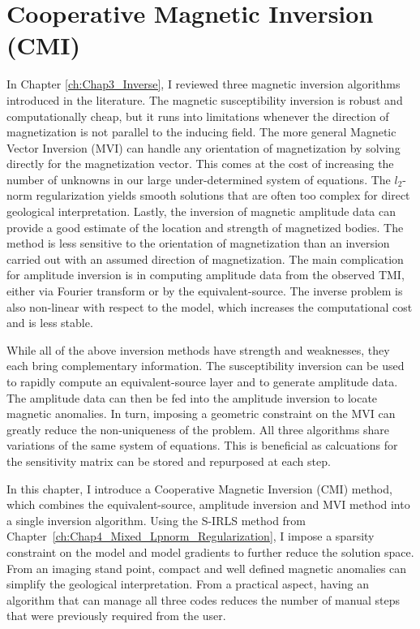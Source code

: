 \graphicspath{{./Figures/}}
\chapter{Cooperative Magnetic Inversion (CMI)}
\label{ch:Chap5_Cooperative_Mag_Inversion_CMI}

In Chapter \ref{ch:Chap3_Inverse}, I reviewed three magnetic inversion algorithms introduced in the literature. 
The magnetic susceptibility inversion is robust and computationally cheap, but it runs into limitations whenever the direction of magnetization is not parallel to the inducing field. 
The more general Magnetic Vector Inversion (MVI) can handle any orientation of magnetization by solving directly for the magnetization vector. 
This comes at the cost of increasing the number of unknowns in our large under-determined system of equations.
The $l_2$-norm regularization yields smooth solutions that are often too complex for direct geological interpretation.
Lastly, the inversion of magnetic amplitude data can provide a good estimate of the location and strength of magnetized bodies. 
The method is less sensitive to the orientation of magnetization than an inversion carried out with an assumed direction of magnetization.
The main complication for amplitude inversion is in computing amplitude data from the observed TMI, either via Fourier transform or by the equivalent-source. The inverse problem is also non-linear with respect to the model, which increases the computational cost and is less stable. 

While all of the above inversion methods have strength and weaknesses, they each bring complementary information.
The susceptibility inversion can be used to rapidly compute an equivalent-source layer and to generate amplitude data.
The amplitude data can then be fed into the amplitude inversion to locate magnetic anomalies.
In turn, imposing a geometric constraint on the MVI can greatly reduce the non-uniqueness of the problem. 
All three algorithms share variations of the same system of equations. This is beneficial as calcuations for the sensitivity matrix can be stored and repurposed at each step.

In this chapter, I introduce a Cooperative Magnetic Inversion (CMI) method, which combines the equivalent-source, amplitude inversion and MVI method into a single inversion algorithm. 
Using the S-IRLS method from Chapter~\ref{ch:Chap4_Mixed_Lpnorm_Regularization}, I impose a sparsity constraint on the model and model gradients to further reduce the solution space.
From an imaging stand point, compact and well defined magnetic anomalies can simplify the geological interpretation.
From a practical aspect, having an algorithm that can manage all three codes reduces the number of manual steps that were previously required from the user. 

